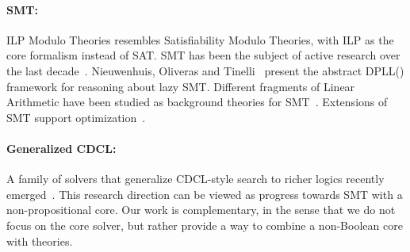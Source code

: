 \documentclass{llncs}
\newcommand{\comment}[1]{}
\newcommand{\dpllt}[0]{DPLL()}
\begin{document}
\paragraph{SMT:}
ILP Modulo Theories resembles Satisfiability Modulo Theories, with ILP
as the core formalism instead of SAT.  SMT has been the subject of
active research over the last
decade~\cite{barrett02,demoura02,dpllt,z3}. Nieuwenhuis, Oliveras and
Tinelli~\cite{dpllt} present the abstract \dpllt{} framework for
reasoning about lazy SMT. Different fragments of Linear Arithmetic
have been studied as background theories for
SMT~\cite{ladpllt,mathsatlia}. Extensions of SMT support
optimization~\cite{smtopt,smtcosts,laqcost}.

\comment{
  \paragraph{Decomposition:} Another family of linear programming
  techniques that bears resemblance to IMT is Benders
  decomposition~\cite{benders62}. The linear programming problem is
  split into a master problem (which has only a subset of the original
  variables) and a subproblem. The master problem is solved first, and
  then the subproblem is solved with the values of the master problem
  fixed (``trial'' values). If the ``trial'' values are unacceptable,
  a cut is derived and added to the master problem. Logic-based
  Benders Decomposition~\cite{logicbenders} generalizes the strategy
  so that the master problem, the subproblem, or both are not
  necessarily linear programs. In IMT, the problem is ``decomposed''
  into a core ILP instance and background theory problems.  }

\paragraph{Generalized CDCL:} A family of solvers that generalize
CDCL-style search to richer logics recently
emerged~\cite{cutsat,naturalsmt,richerdpll,mcsat}. This research
direction can be viewed as progress towards SMT with a
non-propositional core. Our work is complementary, in the sense that
we do not focus on the core solver, but rather provide a way to
combine a non-Boolean core with theories.
\end{document}
